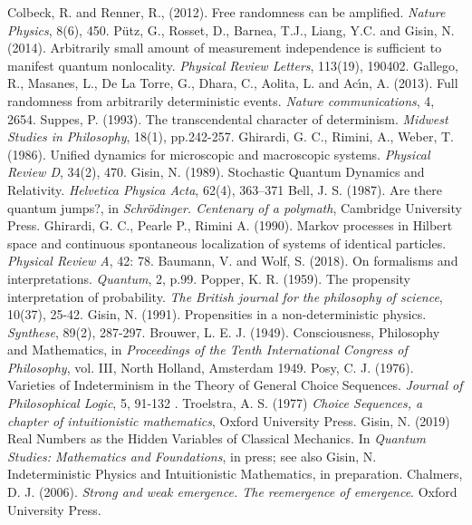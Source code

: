 \documentclass[aps,prl,twocolumn,showpacs,superscriptaddress,groupedaddress, nofootinbib]{revtex4-1}
\begin{document}
\begin{small}
\begin{thebibliography}{200}
 Colbeck, R. and Renner, R., (2012). Free randomness can be amplified. \emph{Nature Physics}, 8(6), 450.
 P{\"u}tz, G., Rosset, D., Barnea, T.J., Liang, Y.C. and Gisin, N. (2014). Arbitrarily small amount of measurement independence is sufficient to manifest quantum nonlocality. \emph{Physical Review Letters}, 113(19), 190402.
 Gallego, R., Masanes, L., De La Torre, G., Dhara, C., Aolita, L. and Ac{\'\i}n, A. (2013). Full randomness from arbitrarily deterministic events. \emph{Nature communications}, 4, 2654.
 Suppes, P. (1993). The transcendental character of determinism. \emph{Midwest Studies in Philosophy}, 18(1), pp.242-257.
 Ghirardi, G. C., Rimini, A., Weber, T. (1986). Unified dynamics for microscopic and macroscopic systems. \emph{Physical Review D}, 34(2), 470.
 Gisin, N. (1989). Stochastic Quantum Dynamics and Relativity. \emph{Helvetica Physica Acta}, 62(4), 363–371
 Bell, J. S. (1987). Are there quantum jumps?, in \emph{Schr{\"o}dinger. Centenary of a polymath}, Cambridge University Press.
 Ghirardi, G. C., Pearle P., Rimini A. (1990). Markov processes in Hilbert space and continuous spontaneous localization of systems of identical particles. \emph{Physical Review A}, 42: 78.
 Baumann, V. and Wolf, S. (2018). On formalisms and interpretations. \emph{Quantum}, 2, p.99.
 Popper, K. R. (1959). The propensity interpretation of probability. \emph{The British journal for the philosophy of science}, 10(37), 25-42.
 Gisin, N. (1991). Propensities in a non-deterministic physics. \emph{Synthese}, 89(2), 287-297.
 Brouwer, L. E. J. (1949). Consciousness, Philosophy and Mathematics, in \emph{Proceedings of the Tenth International Congress of Philosophy}, vol. III, North Holland, Amsterdam 1949.
 Posy,  C. J. (1976). Varieties of Indeterminism in the Theory of General Choice Sequences. \emph{Journal of Philosophical Logic}, 5, 91-132 .
 Troelstra, A. S. (1977)  {\it Choice Sequences, a chapter of intuitionistic mathematics}, Oxford University Press.
 Gisin, N. (2019)  Real Numbers as the Hidden Variables of Classical Mechanics. In \emph{Quantum Studies: Mathematics and Foundations}, in press; see also Gisin, N. Indeterministic Physics and Intuitionistic Mathematics, in preparation.
 Chalmers, D. J. (2006). \emph{Strong and weak emergence. The reemergence of emergence}. Oxford University Press.

\end{thebibliography}
\end{small}
\end{document}

